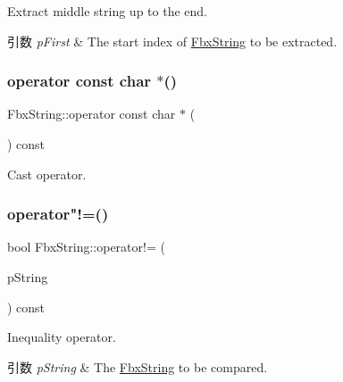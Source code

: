 Extract middle string up to the end. 
\begin{DoxyParams}{引数}
{\em p\+First} & The start index of \hyperlink{class_fbx_string}{Fbx\+String} to be extracted. \\
\hline
\end{DoxyParams}
\mbox{\label{class_fbx_string_a53f82ee512ae5c6f17a3907c1373d62e}} 
\subsubsection{\texorpdfstring{operator const char $\ast$()}{operator const char *()}}
{\footnotesize\ttfamily Fbx\+String\+::operator const char $\ast$ (\begin{DoxyParamCaption}{ }\end{DoxyParamCaption}) const}



Cast operator. 

\mbox{\label{class_fbx_string_a882e2129d8e793e6594260e748db5553}} 
\subsubsection{\texorpdfstring{operator"!=()}{operator!=()}\hspace{0.1cm}{\footnotesize\ttfamily [1/2]}}
{\footnotesize\ttfamily bool Fbx\+String\+::operator!= (\begin{DoxyParamCaption}\item[{const \hyperlink{class_fbx_string}{Fbx\+String} \&}]{p\+String }\end{DoxyParamCaption}) const}

Inequality operator. 
\begin{DoxyParams}{引数}
{\em p\+String} & The \hyperlink{class_fbx_string}{Fbx\+String} to be compared. \\
\hline
\end{DoxyParams}
\mbox{\label{class_fbx_string_acbf3d5ae883d8a17d61b316c420fc94b}} 
